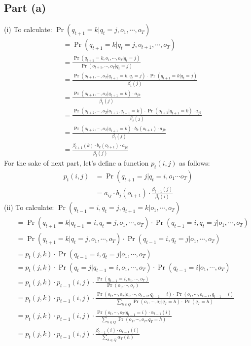 \documentclass[11pt,a4paper,titlepage]{article}
\begin{document}
\subsection*{Part (a)}
(i) To calculate: $\Pr(q_{t+1} = k | q_t = j, o_1, \cdots, o_T)$
\begin{align*}
    ~~ &= \Pr(q_{t+1} = k | q_t = j, o_{t+1}, \cdots, o_T) \tag{Markov property} \\
       &= \frac{\Pr(q_{t+1} = k, o_1, \cdots, o_T | q_t = j)}
               {\Pr(o_{t+1}, \cdots, o_T | q_t = j)} \\
       &= \frac{\Pr(o_{t+1}, \cdots, o_T | q_{t+1} = k, q_t = j) \cdot \Pr(q_{t+1} = k | q_t = j)}
               {\beta_t(j)} \\
       &= \frac{\Pr(o_{t+1}, \cdots, o_T | q_{t+1} = k) \cdot a_{jk}}
               {\beta_t(j)} \tag{Markov property} \\
       &= \frac{\Pr(o_{t+2}, \cdots, o_T | o_{t+1}, q_{t+1} = k) \cdot \Pr(o_{t+1} | q_{t+1} = k) \cdot a_{jk}}
               {\beta_t(j)} \\
       &= \frac{\Pr(o_{t+2}, \cdots, o_T | q_{t+1} = k) \cdot b_k(o_{t+1}) \cdot a_{jk}}
               {\beta_t(j)} \tag{Markov property} \\
       &= \frac{\beta_{t+1}(k) \cdot b_k(o_{t+1}) \cdot a_{jk}}
               {\beta_t(j)}
\end{align*}
For the sake of next part, let's define a function $p_t(i, j)$ as follows:
\begin{align*}
    p_t(i, j) &= \Pr(q_{t+1} = j | q_t = i, o_1 \cdots o_T) \\
              &= a_{ij} \cdot b_j(o_{t+1}) \cdot \frac{\beta_{t+1}(j)}{\beta_t(i)}
\end{align*}
(ii) To calculate: $\Pr(q_{t-1} = i, q_t = j, q_{t+1} = k | o_1, \cdots, o_T)$
\begin{align*}
    ~~ &= \Pr(q_{t+1} = k | q_{t-1} = i, q_t = j, o_1, \cdots, o_T) \cdot \Pr(q_{t-1} = i, q_t = j | o_1, \cdots, o_T) \\
       &= \Pr(q_{t+1} = k | q_t = j, o_1, \cdots, o_T) \cdot \Pr(q_{t-1} = i, q_t = j | o_1, \cdots, o_T) \\
       &= p_t(j, k) \cdot \Pr(q_{t-1} = i, q_t = j | o_1, \cdots, o_T) \\
       &= p_t(j, k) \cdot \Pr(q_t = j | q_{t-1} = i, o_1, \cdots, o_T) \cdot \Pr(q_{t-1} = i | o_1, \cdots, o_T) \\
       &= p_t(j, k) \cdot p_{t-1}(i, j) \cdot \frac{\Pr(q_{t-1} = i, o_1, \cdots, o_T)}{\Pr(o_1, \cdots, o_T)} \\
       &= p_t(j, k) \cdot p_{t-1}(i, j) \cdot
          \frac{\Pr(o_t, \cdots, o_T | o_1, \cdots, o_{t-1}, q_{t-1} = i) \cdot
                \Pr(o_1, \cdots, o_{t-1}, q_{t-1} = i)}
               {\sum_{h \in Q}\Pr(o_1, \cdots, o_T | q_T = h) \cdot \Pr(q_T = h)} \\
       &= p_t(j, k) \cdot p_{t-1}(i, j) \cdot
          \frac{\Pr(o_t, \cdots, o_T | q_{t-1} = i) \cdot \alpha_{t-1}(i)}
               {\sum_{h \in Q}\Pr(o_1, \cdots, o_T, q_T = h)} \\
       &= p_t(j, k) \cdot p_{t-1}(i, j) \cdot
          \frac{\beta_{t-1}(i) \cdot \alpha_{t-1}(i)}{\sum_{h \in Q}\alpha_T(h)}
\end{align*}
\end{document}
